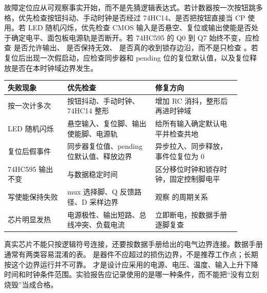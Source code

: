 故障定位应从可观察事实开始，而不是先猜逻辑表达式。若计数器按一次按钮跳多格，优先检查按钮抖动、手动时钟是否经过 74HC14、是否把按钮直接当 CP 使用。若 LED 随机闪烁，优先检查 CMOS 输入是否悬空、复位或输出使能是否处于确定电平、面包板电源轨是否断开。若 74HC595 的 Q0 到 Q7 始终不变，应检查  是否允许输出、 是否保持无效、 是否真的收到锁存边沿，而不是只检查 。若复位后出现一次假启动，应检查同步器和 pending 位的复位默认值，以及复位释放是否在本时钟域边界发生。

\begin{longtable}{L{0.23\linewidth}L{0.34\linewidth}L{0.33\linewidth}}
\toprule
失败现象 & 优先检查 & 修复方向 \\
\midrule
按一次计多次 & 按钮抖动、手动时钟、74HC14 整形 & 增加 RC 消抖，整形后再进时钟域 \\
LED 随机闪烁 & 悬空输入、复位脚、输出使能脚、电源轨 & 给所有输入确定默认电平并检查共地 \\
复位后假事件 & 同步器复位值、pending 位默认值、释放边界 & 异步拉入、同步释放，事件位复位为 0 \\
74HC595 输出不变 &  与数据稳定时间 & 区分移位时钟和锁存时钟，固定控制脚电平 \\
写使能保持失败 & mux 选择脚、Q 反馈路径、D 采样边界 & 观察  的周期关系 \\
芯片明显发热 & 电源极性、输出短路、总线冲突、负载电流 & 立即断电，按数据手册逐脚复查 \\
\bottomrule
\end{longtable}

真实芯片不能只按逻辑符号连接，还要按数据手册给出的电气边界连接。数据手册通常有两类容易混淆的表。 是器件不应超过的损伤边界，不是推荐工作点；长期按这个边界运行并不可靠。 才是设计应采用的电源、电压、温度、输入上升下降时间和时钟条件范围。实验报告应记录使用的是哪一种条件，而不能把“没有立刻烧毁”当成合格。

